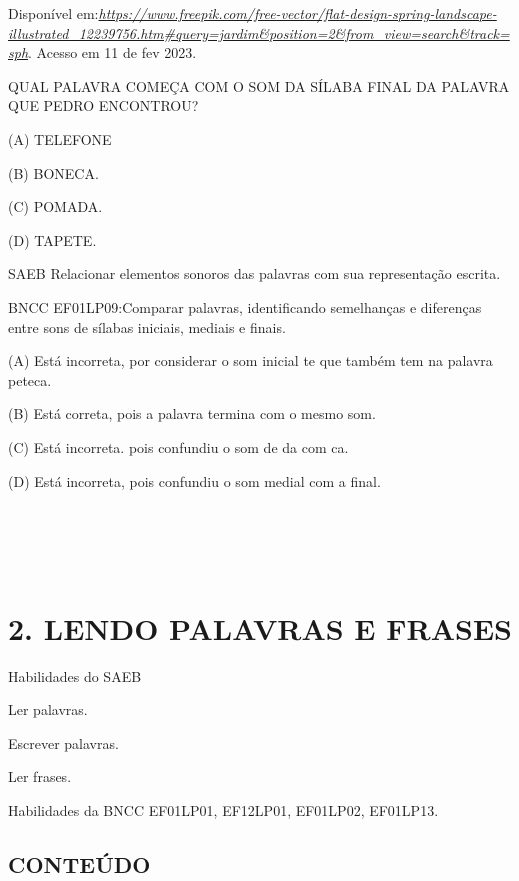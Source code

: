 Disponível
em:\href{https://www.freepik.com/free-vector/flat-design-spring-landscape-illustrated_12239756.htm\#query=jardim\&position=2\&from_view=search\&track=sph}{\emph{https://www.freepik.com/free-vector/flat-design-spring-landscape-illustrated\_12239756.htm\#query=jardim\&position=2\&from\_view=search\&track=sph}}.
Acesso em 11 de fev 2023.

QUAL PALAVRA COMEÇA COM O SOM DA SÍLABA FINAL DA PALAVRA QUE PEDRO
ENCONTROU?

(A) TELEFONE

(B) BONECA.

(C) POMADA.

(D) TAPETE.

\protect\hypertarget{_heading=h.2et92p0}{}{}SAEB Relacionar elementos
sonoros das palavras com sua representação escrita.

BNCC EF01LP09:Comparar palavras, identificando semelhanças e diferenças
entre sons de sílabas iniciais, mediais e finais.

\protect\hypertarget{_heading=h.tyjcwt}{}{}(A) Está incorreta, por
considerar o som inicial te que também tem na palavra peteca.

(B) Está correta, pois a palavra termina com o mesmo som.

(C) Está incorreta. pois confundiu o som de da com ca.

(D) Está incorreta, pois confundiu o som medial com a final.

\section{\texorpdfstring{\\
}{ }}\label{section-3}

\section{2. LENDO PALAVRAS E FRASES
}\label{muxf3dulo-2-lendo-palavras-e-frases}

Habilidades do SAEB

\protect\hypertarget{_heading=h.3dy6vkm}{}{}Ler palavras.

Escrever palavras.

Ler frases.

Habilidades da BNCC 
EF01LP01, EF12LP01, EF01LP02, EF01LP13.

\subsection{CONTEÚDO}\label{conteuxfado-1}

